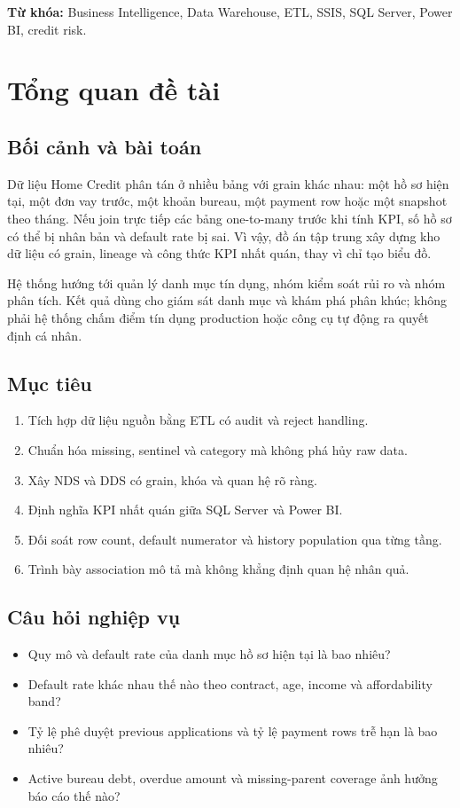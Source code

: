 \documentclass[12pt,a4paper,oneside]{report}
\begin{document}
\noindent\textbf{Từ khóa:} Business Intelligence, Data Warehouse, ETL, SSIS, SQL Server, Power BI, credit risk.

\tableofcontents
\listoftables
\listoffigures
\clearpage
{}

\chapter{Tổng quan đề tài}
\section{Bối cảnh và bài toán}
Dữ liệu Home Credit phân tán ở nhiều bảng với grain khác nhau: một hồ sơ hiện tại, một đơn vay trước, một khoản bureau, một payment row hoặc một snapshot theo tháng. Nếu join trực tiếp các bảng one-to-many trước khi tính KPI, số hồ sơ có thể bị nhân bản và default rate bị sai. Vì vậy, đồ án tập trung xây dựng kho dữ liệu có grain, lineage và công thức KPI nhất quán, thay vì chỉ tạo biểu đồ.

Hệ thống hướng tới quản lý danh mục tín dụng, nhóm kiểm soát rủi ro và nhóm phân tích. Kết quả dùng cho giám sát danh mục và khám phá phân khúc; không phải hệ thống chấm điểm tín dụng production hoặc công cụ tự động ra quyết định cá nhân.

\section{Mục tiêu}
\begin{enumerate}[label=\arabic*.]
  \item Tích hợp dữ liệu nguồn bằng ETL có audit và reject handling.
  \item Chuẩn hóa missing, sentinel và category mà không phá hủy raw data.
  \item Xây NDS và DDS có grain, khóa và quan hệ rõ ràng.
  \item Định nghĩa KPI nhất quán giữa SQL Server và Power BI.
  \item Đối soát row count, default numerator và history population qua từng tầng.
  \item Trình bày association mô tả mà không khẳng định quan hệ nhân quả.
\end{enumerate}

\section{Câu hỏi nghiệp vụ}
\begin{itemize}
  \item Quy mô và default rate của danh mục hồ sơ hiện tại là bao nhiêu?
  \item Default rate khác nhau thế nào theo contract, age, income và affordability band?
  \item Tỷ lệ phê duyệt previous applications và tỷ lệ payment rows trễ hạn là bao nhiêu?
  \item Active bureau debt, overdue amount và missing-parent coverage ảnh hưởng báo cáo thế nào?
\end{itemize}
\end{document}
